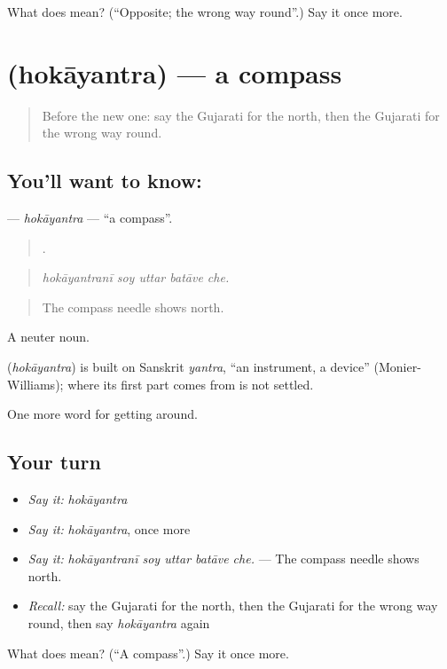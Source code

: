 \begin{tcolorbox}[breakable,colback=teal!4,colframe=teal!35!black,title={Before you move on}]
What does  mean? (\textquotedblleft{}Opposite; the wrong way round\textquotedblright{}.) Say it once more.
\end{tcolorbox}
\section[\texorpdfstring{\gu{હોકાયંત્ર} (hokāyantra)}{હોકાયંત્ર (hokāyantra)}]{ (hokāyantra) — a compass}

\label{lesson:GU-C414-hokayantra}



\begin{quote}
Before the new one: say the Gujarati for the north, then the Gujarati for the wrong way round.
\end{quote}

\subsection*{You'll want to know: }
\textbf{} — \emph{hokāyantra} — \textquotedblleft{}a compass\textquotedblright{}.

\begin{quote}
    .
\end{quote}

\begin{quote}
\emph{hokāyantranī soy uttar batāve che.}
\end{quote}

\begin{quote}
The compass needle shows north.
\end{quote}

A neuter noun.

\begin{cousinweb}
\textbf{} (\emph{hokāyantra}) is built on Sanskrit \emph{yantra}, \textquotedblleft{}an instrument, a device\textquotedblright{} (Monier-Williams); where its first part comes from is not settled.
\end{cousinweb}

\begin{grammarlens}[title={What you've built}]
One more word for getting around.
\end{grammarlens}

\subsection*{Your turn}
\begin{itemize}
\raggedright
  \item \emph{Say it:} \emph{hokāyantra}
  \item \emph{Say it:} \emph{hokāyantra}, once more
  \item \emph{Say it:} \emph{hokāyantranī soy uttar batāve che.} — The compass needle shows north.
  \item \emph{Recall:} say the Gujarati for the north, then the Gujarati for the wrong way round, then say \emph{hokāyantra} again
\end{itemize}

\begin{tcolorbox}[breakable,colback=teal!4,colframe=teal!35!black,title={Before you move on}]
What does  mean? (\textquotedblleft{}A compass\textquotedblright{}.) Say it once more.
\end{tcolorbox}
